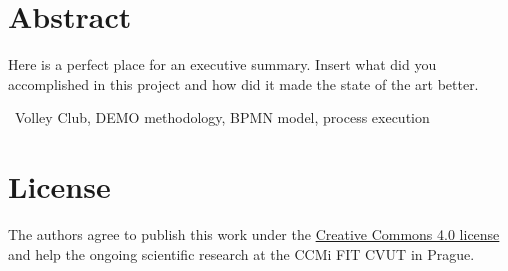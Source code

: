 \section*{Abstract}

Here is a perfect place for an executive summary. Insert what did you accomplished in this project and how did it made the state of the art better. 

\bigskip


~Volley Club, DEMO methodology, BPMN model, process execution

\vfill

\section*{License}
The authors agree to publish this work under the \href{https://creativecommons.org/licenses/by/4.0/}{Creative Commons 4.0 license} and help the ongoing scientific research at the CCMi FIT CVUT in Prague. 